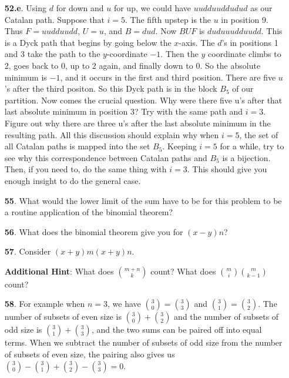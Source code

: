 \documentclass[10pt,]{book}
\theoremstyle{plain}
\theoremstyle{definition}
\theoremstyle{definition}
\numberwithin{equation}{chapter}
\begin{document}
\begin{itemize}[itemsep=1em]
\item[\textbf{52.e}.]Using \(d\) for down and \(u\) for up, we could have \(uudduuddudud\) as our Catalan path. Suppose that \(i = 5\). The fifth upstep is the \(u\) in position 9. Thus \(F = uudduudd\), \(U = u\), and \(B = dud\). Now \(BU F\) is \(duduuudduudd\). This is a Dyck path that begins by going below the \(x\)-axis. The \(d\)'s in positions 1 and 3 take the path to the \(y\)-coordinate \(-1\). Then the \(y\) coordinate climbs to 2, goes back to 0, up to 2 again, and finally down to 0. So the absolute minimum is \(-1\), and it occurs in the first and third position. There are five \(u\)'s after the third positon. So this Dyck path is in the block \(B_5\) of our partition. Now comes the crucial question. Why were there five u's after that last absolute minimum in position 3? Try with the same path and \(i = 3\). Figure out why there are three u's after the last absolute minimum in the resulting path. All this discussion should explain why when \(i = 5\), the set of all Catalan paths is mapped into the set \(B_5\). Keeping \(i = 5\) for a while, try to see why this correspondence between Catalan paths and \(B_5\) is a bijection. Then, if you need to, do the same thing with \(i = 3\). This should give you enough insight to do the general case.%

\item[\textbf{55}.]What would the lower limit of the sum have to be for this problem to be a routine application of the binomial theorem?%

\item[\textbf{56}.]What does the binomial theorem give you for \((x - y)n\)?%

\item[\textbf{57}.]Consider \((x + y)m (x + y)n\).%

\par\smallskip
\noindent\textbf{Additional Hint}: What does \(\binom{m+n}{k}\) count? What does \(\binom{m}{i}\binom{m}{k-1}\) count?%

\item[\textbf{58}.]For example when \(n = 3\), we have \(\binom{3}{0} = \binom{3}{3}\) and \(\binom{3}{1} = \binom{3}{2}\).  The number of subsets of even size is \(\binom{3}{0}+\binom{3}{2}\) and the number of subsets of odd size is \(\binom{3}{1} + \binom{3}{3}\), and the two sums can be paired off into equal terms.  When we subtract the number of subsets of odd size from the number of subsets of even size, the pairing also gives us \(\binom{3}{0} - \binom{3}{1} + \binom{3}{2} - \binom{3}{3} =
0\).%


\end{itemize}
\end{document}
